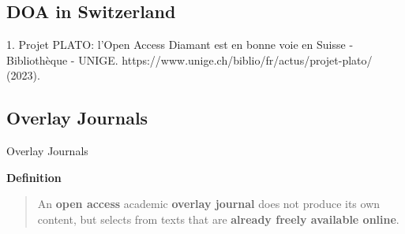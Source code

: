 \documentclass[10pt,compress,serif,aspectratio=169]{beamer}
\begin{document}

\subsection{DOA in Switzerland}

\begin{frame}[t]%
 \vskip1cm%


 1. Projet PLATO: l’Open Access Diamant est en bonne voie en Suisse - Bibliothèque - UNIGE. https://www.unige.ch/biblio/fr/actus/projet-plato/ (2023).
\end{frame}


\subsection{Overlay Journals}

\begin{frame}[t]{Overlay Journals}

 \textbf{Definition}\newline\newline
 \begin{quote}
   An \textbf{open access} academic \textbf{overlay journal} does not produce its own content, but selects from texts that are \textbf{already freely available online}.
 \end{quote}

 
\end{frame}
 
\end{document}
